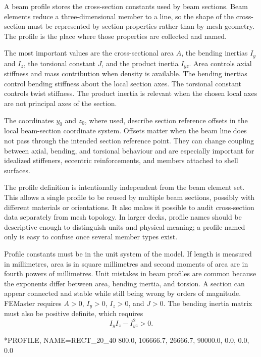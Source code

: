 A beam profile stores the cross-section constants used by beam sections. Beam elements reduce a three-dimensional member to a line, so the shape of the cross-section must be represented by section properties rather than by mesh geometry. The profile is the place where those properties are collected and named.

The most important values are the cross-sectional area \(A\), the bending inertias \(I_y\) and \(I_z\), the torsional constant \(J\), and the product inertia \(I_{yz}\). Area controls axial stiffness and mass contribution when density is available. The bending inertias control bending stiffness about the local section axes. The torsional constant controls twist stiffness. The product inertia is relevant when the chosen local axes are not principal axes of the section.

The coordinates \(y_0\) and \(z_0\), where used, describe section reference offsets in the local beam-section coordinate system. Offsets matter when the beam line does not pass through the intended section reference point. They can change coupling between axial, bending, and torsional behaviour and are especially important for idealized stiffeners, eccentric reinforcements, and members attached to shell surfaces.

The profile definition is intentionally independent from the beam element set. This allows a single profile to be reused by multiple beam sections, possibly with different materials or orientations. It also makes it possible to audit cross-section data separately from mesh topology. In larger decks, profile names should be descriptive enough to distinguish units and physical meaning; a profile named only  is easy to confuse once several member types exist.

Profile constants must be in the unit system of the model. If length is measured in millimetres, area is in square millimetres and second moments of area are in fourth powers of millimetres. Unit mistakes in beam profiles are common because the exponents differ between area, bending inertia, and torsion. A section can appear connected and stable while still being wrong by orders of magnitude. FEMaster requires \(A>0\), \(I_y>0\), \(I_z>0\), and \(J>0\). The bending inertia matrix must also be positive definite, which requires
\[
I_y I_z-I_{yz}^2>0.
\]

\begin{exampledeck}
*PROFILE, NAME=RECT_20_40
800.0, 106666.7, 26666.7, 90000.0, 0.0, 0.0, 0.0
\end{exampledeck}

